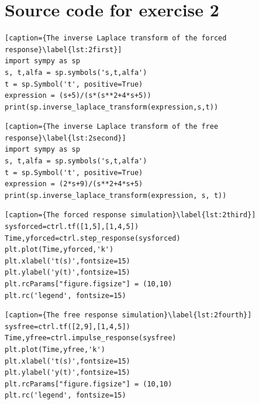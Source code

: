 \documentclass[a4paper,11pt]{article}
\begin{document}
\section{Source code for exercise 2}
\begin{lstlisting}[caption={The inverse Laplace transform of the forced response}\label{lst:2first}]
import sympy as sp
s, t,alfa = sp.symbols('s,t,alfa')
t = sp.Symbol('t', positive=True)
expression = (s+5)/(s*(s**2+4*s+5))
print(sp.inverse_laplace_transform(expression,s,t))
\end{lstlisting}
\begin{lstlisting}[caption={The inverse Laplace transform of the free response}\label{lst:2second}]
import sympy as sp
s, t,alfa = sp.symbols('s,t,alfa')
t = sp.Symbol('t', positive=True)
expression = (2*s+9)/(s**2+4*s+5)
print(sp.inverse_laplace_transform(expression, s, t))
\end{lstlisting}
\begin{lstlisting}[caption={The forced response simulation}\label{lst:2third}]
sysforced=ctrl.tf([1,5],[1,4,5])
Time,yforced=ctrl.step_response(sysforced)
plt.plot(Time,yforced,'k')
plt.xlabel('t(s)',fontsize=15)
plt.ylabel('y(t)',fontsize=15)
plt.rcParams["figure.figsize"] = (10,10)
plt.rc('legend', fontsize=15)
\end{lstlisting}
\begin{lstlisting}[caption={The free response simulation}\label{lst:2fourth}]
sysfree=ctrl.tf([2,9],[1,4,5])
Time,yfree=ctrl.impulse_response(sysfree)
plt.plot(Time,yfree,'k')
plt.xlabel('t(s)',fontsize=15)
plt.ylabel('y(t)',fontsize=15)
plt.rcParams["figure.figsize"] = (10,10)
plt.rc('legend', fontsize=15)
\end{lstlisting}
\end{document}

